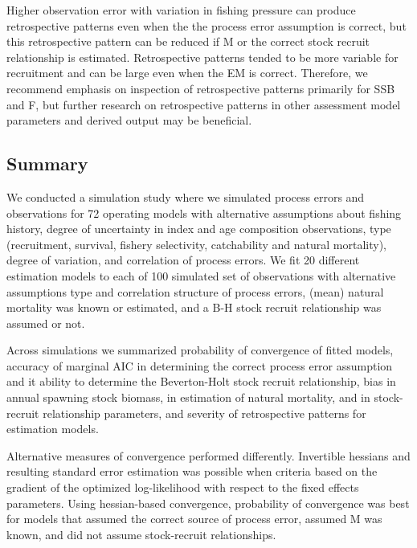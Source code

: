\documentclass[
  12pt,
]{article}
\begin{document}
Higher observation error with variation in fishing pressure can produce
retrospective patterns even when the the process error assumption is
correct, but this retrospective pattern can be reduced if M or the
correct stock recruit relationship is estimated. Retrospective patterns
tended to be more variable for recruitment and can be large even when
the EM is correct. Therefore, we recommend emphasis on inspection of
retrospective patterns primarily for SSB and F, but further research on
retrospective patterns in other assessment model parameters and derived
output may be beneficial.

\hypertarget{summary}{%
\subsection*{Summary}\label{summary}}

We conducted a simulation study where we simulated process errors and
observations for 72 operating models with alternative assumptions about
fishing history, degree of uncertainty in index and age composition
observations, type (recruitment, survival, fishery selectivity,
catchability and natural mortality), degree of variation, and
correlation of process errors. We fit 20 different estimation models to
each of 100 simulated set of observations with alternative assumptions
type and correlation structure of process errors, (mean) natural
mortality was known or estimated, and a B-H stock recruit relationship
was assumed or not.

Across simulations we summarized probability of convergence of fitted
models, accuracy of marginal AIC in determining the correct process
error assumption and it ability to determine the Beverton-Holt stock
recruit relationship, bias in annual spawning stock biomass, in
estimation of natural mortality, and in stock-recruit relationship
parameters, and severity of retrospective patterns for estimation
models.

Alternative measures of convergence performed differently. Invertible
hessians and resulting standard error estimation was possible when
criteria based on the gradient of the optimized log-likelihood with
respect to the fixed effects parameters. Using hessian-based
convergence, probability of convergence was best for models that assumed
the correct source of process error, assumed M was known, and did not
assume stock-recruit relationships.
\end{document}
